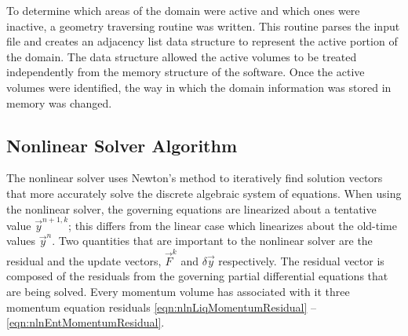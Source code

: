 To determine which areas of the domain were active and which ones were inactive, a geometry traversing routine was written.
This routine parses the \cobra{} input file and creates an adjacency list data structure to represent the active portion of the domain.
The data structure allowed the active volumes to be treated independently from the memory structure of the software.
Once the active volumes were identified, the way in which the domain information was stored in memory was changed.

\subsection{Nonlinear Solver Algorithm}
\label{subsect:nlnCobraAlgo}

The nonlinear solver uses Newton's method to iteratively find solution vectors that more accurately solve the discrete algebraic system of equations.
When using the nonlinear solver, the governing equations are linearized about a tentative value $\vec{y}^{n+1, k}$; this differs from the linear case which linearizes about the old-time values $\vec{y}^{n}$.
Two quantities that are important to the nonlinear solver are the residual and the update vectors, $\vec{F}^{k}$ and $\delta \vec{y}$ respectively.
The residual vector is composed of the residuals from the governing partial differential equations that are being solved.
Every momentum volume has associated with it three momentum equation residuals \eqref{eqn:nlnLiqMomentumResidual} -- \eqref{eqn:nlnEntMomentumResidual}.

